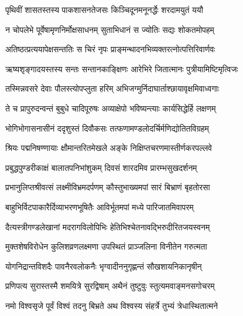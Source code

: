 \storymeta


\twolineshloka
{पृथिवीं शासतस्तस्य पाकशासनतेजसः}
{किञ्चिदूनमनूनर्द्धेः शरदामयुतं ययौ} %

\twolineshloka
{न चोपलेभे पूर्वेषामृणनिर्मोक्षसाधनम्}
{सुताभिधानं स ज्योतिः सद्यः शोकतमोपहम्} %

\twolineshloka
{अतिष्ठत्प्रत्ययापेक्षसन्ततिः स चिरं नृपः}
{प्राङ्मन्थादनभिव्यक्तरत्नोत्पत्तिरिवार्णवः} %

\twolineshloka
{ऋष्यशृङ्गादयस्तस्य सन्तः सन्तानकाङ्क्षिणः}
{आरेभिरे जितात्मानः पुत्रीयामिष्टिमृत्विजः} %

\twolineshloka
{तस्मिन्नवसरे देवाः पौलस्त्योपप्लुता हरिम्}
{अभिजग्मुर्निदाघार्ताश्छायावृक्षमिवाध्वगाः} %

\twolineshloka
{ते च प्रापुरुदन्वन्तं बुबुधे चादिपूरुषः}
{अव्याक्षेपो भविष्यन्त्याः कार्यसिद्धेर्हि लक्षणम्} %

\twolineshloka
{भोगिभोगासनासीनं ददृशुस्तं दिवौकसः}
{तत्फणामण्डलोदर्चिर्मणिद्योतितविग्रहम्} %

\twolineshloka
{श्रियः पद्मनिषण्णायाः क्षौमान्तरितमेखले}
{अङ्के निक्षिप्तचरणमास्तीर्णकरपल्लवे} %

\twolineshloka
{प्रबुद्धपुण्डरीकाक्षं बालातपनिभांशुकम्}
{दिवसं शारदमिव प्रारम्भसुखदर्शनम्} %

\twolineshloka
{प्रभानुलिप्तश्रीवत्सं लक्ष्मीविभ्रमदर्पणम्}
{कौस्तुभाख्यमपां सारं बिभ्राणं बृहतोरसा} %

\twolineshloka
{बाहुभिर्विटपाकारैर्दिव्याभरणभूषितैः}
{आविर्भूतमपां मध्ये पारिजातमिवापरम्} %

\twolineshloka
{दैत्यस्त्रीगण्डलेखानां मदरागविलोपिभिः}
{हेतिभिश्चेतनावद्भिरुदीरितजयस्वनम्} %

\twolineshloka
{मुक्तशेषविरोधेन कुलिशव्रणलक्ष्मणा}
{उपस्थितं प्राञ्जलिना विनीतेन गरुत्मता} %

\twolineshloka
{योगनिद्रान्तविशदैः पावनैरवलोकनैः}
{भृग्वादीननुगृह्णन्तं सौखशायनिकानृषीन्} %

\twolineshloka
{प्रणिपत्य सुरास्तस्मै शमयित्रे सुरद्विषाम्}
{अथैनं तुष्टुवुः स्तुत्यमवाङ्मनसगोचरम्} %

\twolineshloka
{नमो विश्वसृजे पूर्वं विश्वं तदनु बिभ्रते}
{अथ विश्वस्य संहर्त्रे तुभ्यं त्रेधास्थितात्मने} %

